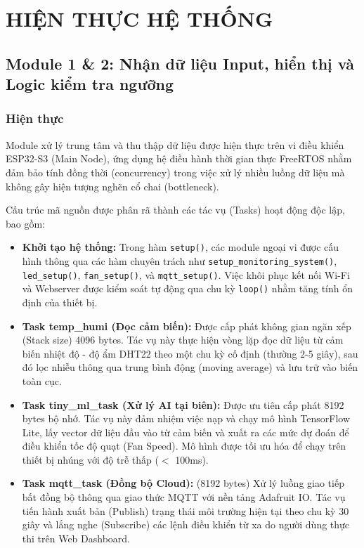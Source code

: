 \section{HIỆN THỰC HỆ THỐNG}

\subsection{Module 1 \& 2: Nhận dữ liệu Input, hiển thị và Logic kiểm tra ngưỡng}

\subsubsection{Hiện thực}

Module xử lý trung tâm và thu thập dữ liệu được hiện thực trên vi điều khiển ESP32-S3 (Main Node), ứng dụng hệ điều hành thời gian thực FreeRTOS nhằm đảm bảo tính đồng thời (concurrency) trong việc xử lý nhiều luồng dữ liệu mà không gây hiện tượng nghẽn cổ chai (bottleneck).

Cấu trúc mã nguồn được phân rã thành các tác vụ (Tasks) hoạt động độc lập, bao gồm:

\begin{itemize}
    \item \textbf{Khởi tạo hệ thống:} Trong hàm \texttt{setup()}, các module ngoại vi được cấu hình thông qua các hàm chuyên trách như \texttt{setup\_monitoring\_system()}, \texttt{led\_setup()}, \texttt{fan\_setup()}, và \texttt{mqtt\_setup()}. Việc khôi phục kết nối Wi-Fi và Webserver được kiểm soát tự động qua chu kỳ \texttt{loop()} nhằm tăng tính ổn định của thiết bị.
    
    \item \textbf{Task temp\_humi (Đọc cảm biến):} Được cấp phát không gian ngăn xếp (Stack size) 4096 bytes. Tác vụ này thực hiện vòng lặp đọc dữ liệu từ cảm biến nhiệt độ - độ ẩm DHT22 theo một chu kỳ cố định (thường 2-5 giây), sau đó lọc nhiễu thông qua trung bình động (moving average) và lưu trữ vào biến toàn cục.
    
    \item \textbf{Task tiny\_ml\_task (Xử lý AI tại biên):} Được ưu tiên cấp phát 8192 bytes bộ nhớ. Tác vụ này đảm nhiệm việc nạp và chạy mô hình TensorFlow Lite, lấy vector dữ liệu đầu vào từ cảm biến và xuất ra các mức dự đoán để điều khiển tốc độ quạt (Fan Speed). Mô hình được tối ưu hóa để chạy trên thiết bị nhúng với độ trễ thấp ($<$ 100ms).
    
    \item \textbf{Task mqtt\_task (Đồng bộ Cloud):} (8192 bytes) Xử lý luồng giao tiếp bất đồng bộ thông qua giao thức MQTT với nền tảng Adafruit IO. Tác vụ tiến hành xuất bản (Publish) trạng thái môi trường hiện tại theo chu kỳ 30 giây và lắng nghe (Subscribe) các lệnh điều khiển từ xa do người dùng thực thi trên Web Dashboard.
\end{itemize}

